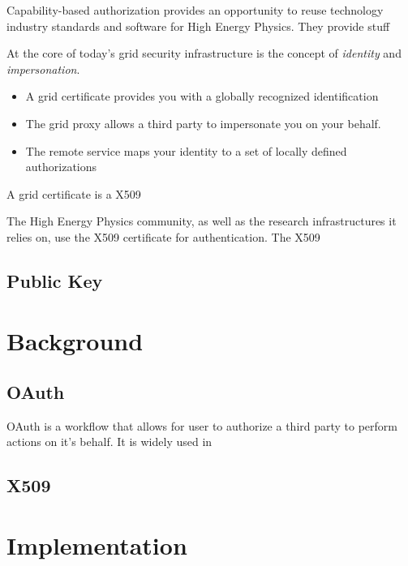 \documentclass{webofc}
\begin{document}
Capability-based authorization provides an opportunity to reuse technology industry standards and software for High Energy Physics.  They provide stuff

At the core of today's grid security infrastructure is the concept of \textit{identity} and \textit{impersonation}.

\begin{itemize}
    \item A grid certificate provides you with a globally recognized identification
    \item The grid proxy allows a third party to impersonate you on your behalf.
    \item The remote service maps your identity to a set of locally defined authorizations
\end{itemize}

A grid certificate is a X509 \cite{housley1998internet} 


The High Energy Physics community, as well as the research infrastructures it relies on, use the X509 certificate for authentication.  The X509


\subsection{Public Key}





\section{Background}
\label{background}

\subsection{OAuth}
\label{sec:oauth}

OAuth is a workflow that allows for user to authorize a third party to perform actions on it's behalf.  It is widely used in 


\subsection{X509}
\label{sec:x509}

\section{Implementation}
\label{sec:implementation}
\end{document}
